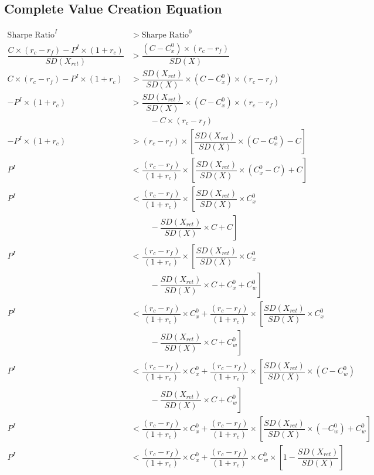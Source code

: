 \documentclass[
]{article}
\begin{document}
\hypertarget{complete-value-creation-equation-1}{%
\subsection{Complete Value Creation
Equation}\label{complete-value-creation-equation-1}}

\begin{align}
\nonumber \text{Sharpe Ratio}^I &> \text{Sharpe Ratio}^0\\
\nonumber \dfrac{C\times (r_c-r_f)-P^{I} \times(1 + r_c)}{SD(X_{ret})} &> \dfrac{(C-C_{x}^{0})\times (r_c-r_f)}{SD(X)}\\
\nonumber C\times (r_c-r_f)-P^{I} \times(1 + r_c) &> \dfrac{SD(X_{ret})}{SD(X)} \times (C-C_{x}^{0})\times (r_c-r_f)\\
\nonumber -P^{I} \times(1 + r_c) &> \dfrac{SD(X_{ret})}{SD(X)}\times (C-C_{x}^{0}) \times (r_c-r_f)\\
\nonumber &\mathrel{\phantom{<}} \quad - C \times (r_c-r_f)\\
\nonumber -P^{I} \times(1 + r_c) &> (r_c-r_f) \times \left[\dfrac{SD(X_{ret})}{SD(X)}\times (C-C_{x}^{0}) - C\right]\\
\nonumber P^{I} &< \dfrac{(r_c-r_f)}{(1 + r_c)} \times \left[\dfrac{SD(X_{ret})}{SD(X)}\times (C_{x}^{0}- C) + C\right]\\
\nonumber P^{I} &< \dfrac{(r_c-r_f)}{(1 + r_c)} \times \left[\dfrac{SD(X_{ret})}{SD(X)}\times C_{x}^{0}\right.\\
\nonumber &\mathrel{\phantom{<}}\left. \quad - \dfrac{SD(X_{ret})}{SD(X)}\times C + C\right]\\
\nonumber P^{I} &< \dfrac{(r_c-r_f)}{(1 + r_c)} \times \left[\dfrac{SD(X_{ret})}{SD(X)}\times C_{x}^{0}\right.\\
\nonumber &\mathrel{\phantom{<}} \left. \quad - \dfrac{SD(X_{ret})}{SD(X)}\times C + C_{x}^{0} + C_{w}^{0}\right]\\
\nonumber P^{I} &< \dfrac{(r_c-r_f)}{(1 + r_c)} \times C_{x}^{0} + \dfrac{(r_c-r_f)}{(1 + r_c)} \times \left[\dfrac{SD(X_{ret})}{SD(X)}\times C_{x}^{0}\right.\\
\nonumber &\mathrel{\phantom{<}}\left. \quad - \dfrac{SD(X_{ret})}{SD(X)}\times C + C_{w}^{0}\right]\\
\nonumber P^{I} &< \dfrac{(r_c-r_f)}{(1 + r_c)} \times C_{x}^{0} + \dfrac{(r_c-r_f)}{(1 + r_c)} \times \left[\dfrac{SD(X_{ret})}{SD(X)}\times (C - C_{w}^{0})\right.\\
\nonumber &\mathrel{\phantom{<}}\left. \quad - \dfrac{SD(X_{ret})}{SD(X)}\times C + C_{w}^{0}\right]\\
\nonumber P^{I} &< \dfrac{(r_c-r_f)}{(1 + r_c)} \times C_{x}^{0} + \dfrac{(r_c-r_f)}{(1 + r_c)} \times \left[\dfrac{SD(X_{ret})}{SD(X)}\times (-C_{w}^{0})  + C_{w}^{0}\right]\\
P^{I} &< \dfrac{(r_c-r_f)}{(1 + r_c)} \times C_{x}^{0} + \dfrac{(r_c-r_f)}{(1 + r_c)} \times C_{w}^{0} \times \left[1 - \dfrac{SD(X_{ret})}{SD(X)}\right] \label{final}
\end{align}
\end{document}
